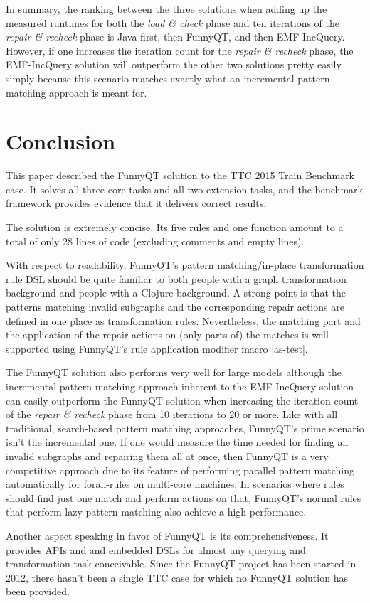 \documentclass[submission]{eptcs}
\newcommand{\code}{\clojureinline}
\begin{document}
In summary, the ranking between the three solutions when adding up the measured
runtimes for both the \emph{load \& check} phase and ten iterations of the
\emph{repair \& recheck} phase is Java first, then FunnyQT, and then
EMF-IncQuery.  However, if one increases the iteration count for the
\emph{repair \& recheck} phase, the EMF-IncQuery solution will outperform the
other two solutions pretty easily simply because this scenario matches exactly
what an incremental pattern matching approach is meant for.


\section{Conclusion}
\label{sec:conclusion}

This paper described the FunnyQT solution to the TTC 2015 Train Benchmark case.
It solves all three core tasks and all two extension tasks, and the benchmark
framework provides evidence that it delivers correct results.

The solution is extremely concise.  Its five rules and one function amount to a
total of only 28 lines of code (excluding comments and empty lines).

With respect to readability, FunnyQT's pattern matching/in-place transformation
rule DSL should be quite familiar to both people with a graph transformation
background and people with a Clojure background.  A strong point is that the
patterns matching invalid subgraphs and the corresponding repair actions are
defined in one place as transformation rules.  Nevertheless, the matching part
and the application of the repair actions on (only parts of) the matches is
well-supported using FunnyQT's rule application modifier macro \code|as-test|.

The FunnyQT solution also performs very well for large models although the
incremental pattern matching approach inherent to the EMF-IncQuery solution can
easily outperform the FunnyQT solution when increasing the iteration count of
the \emph{repair \& recheck} phase from 10 iterations to 20 or more.  Like with
all traditional, search-based pattern matching approaches, FunnyQT's prime
scenario isn't the incremental one.  If one would measure the time needed for
finding all invalid subgraphs and repairing them all at once, then FunnyQT is a
very competitive approach due to its feature of performing parallel pattern
matching automatically for forall-rules on multi-core machines.  In scenarios
where rules should find just one match and perform actions on that, FunnyQT's
normal rules that perform lazy pattern matching also achieve a high
performance.

Another aspect speaking in favor of FunnyQT is its comprehensiveness.  It
provides APIs and and embedded DSLs for almost any querying and transformation
task conceivable.  Since the FunnyQT project has been started in 2012, there
hasn't been a single TTC case for which no FunnyQT solution has been provided.





\end{document}
